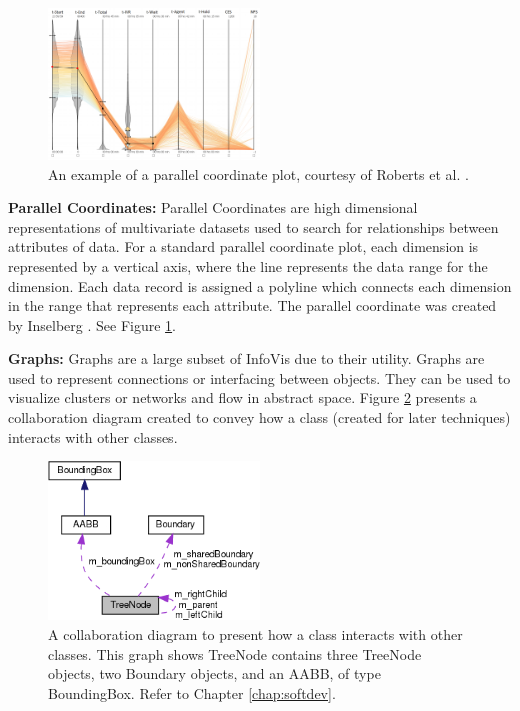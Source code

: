 \begin{figure}[t]
\centering
\includegraphics[width=0.5\textwidth]{images/ch1/pc2}
\caption{An example of a parallel coordinate plot, courtesy of Roberts et al. \cite{roberts2018smart}. } \label{fig:pc}
\end{figure}
\noindent
\textbf{Parallel Coordinates: } Parallel Coordinates are high dimensional representations of multivariate datasets used to search for relationships between attributes of data. For a standard parallel coordinate plot, each dimension is represented by a vertical axis, where the line represents the data range for the dimension. Each data record is assigned a polyline which connects each dimension in the range that represents each attribute. The parallel coordinate was created by Inselberg \cite{inselberg1985plane}. See Figure \ref{fig:pc}.

\noindent
\textbf{Graphs: } Graphs are a large subset of InfoVis due to their utility. Graphs are used to represent connections or interfacing between objects. They can be used to visualize clusters or networks and flow in abstract space. Figure \ref{fig:graph} presents a collaboration diagram created to convey how a class (created for later techniques) interacts with other classes. 

\begin{figure}[b]
\centering
\includegraphics[width=0.5\textwidth]{images/ch1/graph}
\caption{A collaboration diagram to present how a class interacts with other classes. This graph shows TreeNode contains three TreeNode objects, two Boundary objects, and an AABB, of type BoundingBox. Refer to Chapter \ref{chap:softdev}.} \label{fig:graph}
\end{figure}


